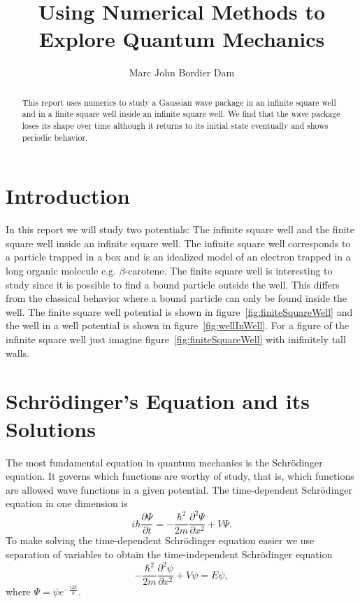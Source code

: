 \documentclass[12pt,a4paper]{article}
\author{Marc John Bordier Dam}
\title{Using Numerical Methods to Explore Quantum Mechanics}
\newcommand{\pdiff}[2]{\frac{\partial #1}{\partial #2}}
\newcommand{\pdiffn}[3]{\frac{\partial^{#3} #1}{\partial #2^{#3}}}
\begin{document}
\maketitle

\begin{abstract}
This report uses numerics to study a Gaussian wave package in an infinite square well and in a finite square well inside an infinite square well. We find that the wave package loses its shape over time although it returns to its initial state eventually and shows periodic behavior.
\end{abstract}

\tableofcontents

\section{Introduction}
In this report we will study two potentials: The infinite square well and the finite square well inside an infinite square well. The infinite square well corresponds to a particle trapped in a box and is an idealized model of an electron trapped in a long organic molecule e.g. $\beta$-carotene. The finite square well is interesting to study since it is possible to find a bound particle outside the well. This differs from the classical behavior where a bound particle can only be found inside the well. The finite square well potential is shown in figure~\ref{fig:finiteSquareWell} and the well in a well potential is shown in figure~\ref{fig:wellInWell}. For a figure of the infinite square well just imagine figure~\ref{fig:finiteSquareWell} with inifinitely tall walls.

\section{Schrödinger's Equation and its Solutions}
The most fundamental equation in quantum mechanics is the Schrödinger equation. It governs which functions are worthy of study, that is, which functions are allowed wave functions in a given potential. The time-dependent Schrödinger equation in one dimension is
\begin{equation}
i \hbar \pdiff{\Psi}{t} = - \frac{\hbar^2}{2 m} \pdiffn{\Psi}{x}{2} + V \Psi.
\end{equation}
To make solving the time-dependent Schrödinger equation easier we use separation of variables to obtain the time-independent Schrödinger equation
\begin{equation}
- \frac{\hbar^2}{2 m} \pdiffn{\psi}{x}{2} + V \psi = E \psi,
\end{equation}
where $\Psi = \psi e^{-\frac{i E t}{\hbar}}$.
\end{document}
